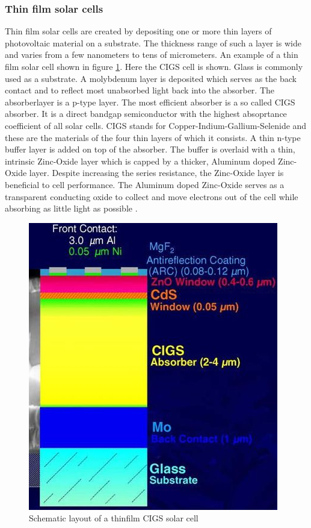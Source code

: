 \subsubsection{Thin film solar cells}
Thin film solar cells are created by depositing one or more thin layers of photovoltaic material on a substrate. The thickness range of such a layer is wide and varies from a few nanometers to tens of micrometers. An example of a thin film solar cell shown in figure 
\ref{fig:thinfilm_cell}. Here the CIGS cell is shown. Glass is commonly used as a substrate. A molybdenum layer is deposited which serves as the back contact and to reflect most unabsorbed light back into the absorber. The absorberlayer is a p-type layer. The most efficient absorber is a so called CIGS absorber. It is a direct bandgap semiconductor with the highest absoprtance coefficient of all solar cells. CIGS stands for Copper-Indium-Gallium-Selenide and these are the materials of the four thin layers of which it consists. A thin n-type buffer layer is added on top of the absorber. The buffer is overlaid with a thin, intrinsic Zinc-Oxide layer which is capped by a thicker, Aluminum doped Zinc-Oxide layer. Despite increasing the series resistance, the Zinc-Oxide layer is beneficial to cell performance. The Aluminum doped Zinc-Oxide serves as a transparent conducting oxide to collect and move electrons out of the cell while absorbing as little light as possible \cite{dhere}.

\begin{figure}
\includegraphics{chapters/img/thinfilm_solar_cell.png}
\caption{Schematic layout of a thinfilm CIGS solar cell}
\label{fig:thinfilm_cell}
\end{figure}

